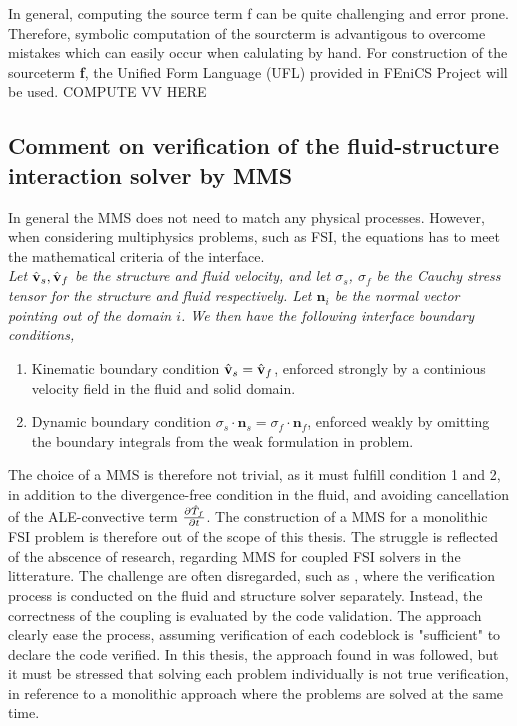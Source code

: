 In general, computing the source term f can be quite challenging and error prone.  Therefore, symbolic computation of the sourcterm is advantigous to overcome mistakes which can easily occur when calulating by hand. For construction of the sourceterm \textbf{f}, the Unified Form Language (UFL) \cite{Alnes2015} provided in FEniCS Project will be used. COMPUTE VV HERE

\subsection{Comment on verification of the fluid-structure interaction solver by MMS}
In general the MMS does not need to match any physical processes. However, when considering multiphysics problems, such as FSI, the equations has to meet the mathematical criteria of the interface. \\

\textit{Let $\hat{\mathbf{v}}_s, \hat{\mathbf{v}}_f$ be the structure and fluid velocity, and let $\sigma_s$, $\sigma_f$ be the Cauchy stress tensor for the structure and fluid respectively. Let $\mathbf{n}_i$ be the normal vector pointing out of the domain $i$. We then have the following interface boundary conditions,}
\begin{enumerate}

\item Kinematic boundary condition $\hat{\mathbf{v}}_s = \hat{\mathbf{v}}_f$, enforced strongly by a continious velocity field in the fluid
        and solid domain.
\item Dynamic boundary condition $\sigma_s \cdot \mathbf{n}_s = \sigma_f \cdot \mathbf{n}_f$, enforced weakly by omitting the 
        boundary integrals from the weak formulation in problem.
\end{enumerate}
The choice of a MMS is therefore not trivial, as it must fulfill condition 1 and 2, in addition to the divergence-free condition in the fluid, and avoiding cancellation of the ALE-convective term $\frac{\partial \hat{T}_f}{\partial t}$.  The construction of a MMS for a monolithic FSI problem is therefore out of the scope of this thesis. The struggle is reflected of the abscence of research, regarding MMS for coupled FSI solvers in the litterature. The challenge are often disregarded, such as \cite{Sheldon2014}, where the verification process is conducted on the fluid and structure solver separately. Instead, the correctness of the coupling is evaluated by the code validation. The approach clearly ease the process, assuming verification of each codeblock is "sufficient" to declare the code verified. In this thesis, the approach found in \cite{Sheldon2014} was followed, but it must be stressed that solving each problem individually is not true verification, in reference to a monolithic approach where the problems are solved at the same time.

